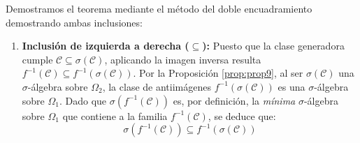 \begin{demostracion}
Demostramos el teorema mediante el método del doble encuadramiento demostrando ambas inclusiones:
\begin{enumerate}[label=\arabic*.]
    \item \textbf{Inclusión de izquierda a derecha ($\subseteq$):}
    Puesto que la clase generadora cumple $\mathcal{C} \subseteq \sigma(\mathcal{C})$, aplicando la imagen inversa resulta $f^{-1}(\mathcal{C}) \subseteq f^{-1}(\sigma(\mathcal{C}))$.
    Por la Proposición \ref{prop:prop9}, al ser $\sigma(\mathcal{C})$ una $\sigma$-álgebra sobre $\Omega_2$, la clase de antiimágenes $f^{-1}(\sigma(\mathcal{C}))$ es una $\sigma$-álgebra sobre $\Omega_1$.
    Dado que $\sigma(f^{-1}(\mathcal{C}))$ es, por definición, la \textit{mínima} $\sigma$-álgebra sobre $\Omega_1$ que contiene a la familia $f^{-1}(\mathcal{C})$, se deduce que:
    \[
        \sigma(f^{-1}(\mathcal{C})) \subseteq f^{-1}(\sigma(\mathcal{C}))
    \]


\end{enumerate}
\end{demostracion}
